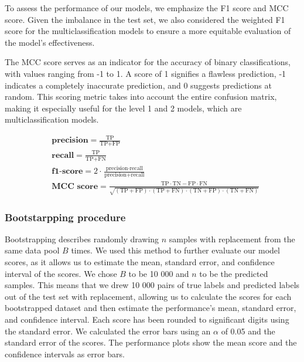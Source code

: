 \documentclass{bioinfo}
\begin{document}
\begin{methods}
To assess the performance of our models, we emphasize the F1 score and MCC score. 
Given the imbalance in the test set, we also considered the weighted F1 score for the multiclassification models
to ensure a more equitable evaluation of the model's effectiveness.

The MCC score serves as an indicator for the accuracy of binary classifications, with values ranging from -1 to 1. 
A score of 1 signifies a flawless prediction, -1 indicates a completely inaccurate prediction, and 0 suggests predictions at random.
This scoring metric takes into account the entire confusion matrix, making it especially
useful for the level 1 and 2 models, which are multiclassification models.


\begin{align}
	&\textbf{precision} = \frac{\text{TP}}{\text{TP} + \text{FP}} \\
    &\textbf{recall} = \frac{\text{TP}}{\text{TP} + \text{FN}} \\
    &\textbf{f1-score} = 2 \cdot \frac{\text{precision} \cdot \text{recall}}{\text{precision} + \text{recall}} \\
    &\textbf{MCC score} = \frac{\text{TP} \cdot \text{TN} - \text{FP} \cdot \text{FN}}{\sqrt{(\text{TP} + \text{FP}) \cdot (\text{TP} + \text{FN}) \cdot (\text{TN} + \text{FP}) \cdot (\text{TN} + \text{FN})}}
\end{align}




\subsubsection{Bootstarpping procedure}
Bootstrapping describes randomly drawing $n$ samples with replacement from the same data pool $B$ times.
We used this method to further evaluate our model scores, as it allows us to estimate the mean, standard error, and confidence interval of the scores.
We chose $B$ to be 10 000 and $n$ to be the predicted samples.
This means that we drew 10 000 pairs of true labels and predicted labels out of the test set with replacement,
allowing us to calculate the scores for each bootstrapped dataset and then estimate the performance's mean, 
standard error, and confidence interval.
Each score has been rounded to significant digits using the standard error.
We calculated the error bars using an $\alpha$ of 0.05 and the standard error of the scores.
The performance plots show the mean score and the confidence intervals as error bars.

\end{methods}
\end{document}
